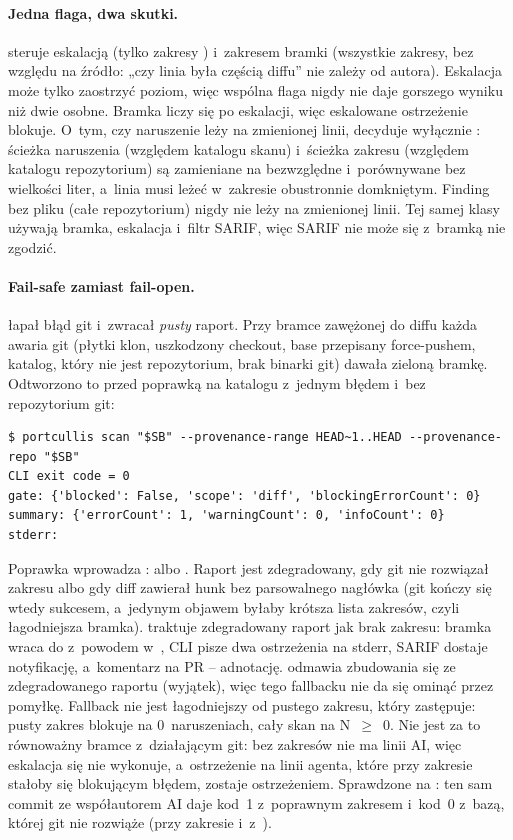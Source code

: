 \paragraph{Jedna flaga, dwa skutki.}  steruje eskalacją
(tylko zakresy ) i~zakresem bramki (wszystkie zakresy, bez względu na
źródło: „czy linia była częścią diffu” nie zależy od autora). Eskalacja może tylko
zaostrzyć poziom, więc wspólna flaga nigdy nie daje gorszego wyniku niż dwie osobne.
Bramka liczy się po eskalacji, więc eskalowane ostrzeżenie blokuje. O~tym, czy naruszenie
leży na zmienionej linii, decyduje wyłącznie : ścieżka naruszenia
(względem katalogu skanu) i~ścieżka zakresu (względem katalogu repozytorium) są
zamieniane na bezwzględne i~porównywane bez wielkości liter, a~linia musi leżeć w~zakresie
obustronnie domkniętym. Finding bez pliku (całe repozytorium) nigdy nie leży na zmienionej
linii. Tej samej klasy używają bramka, eskalacja i~filtr SARIF, więc SARIF nie może się
z~bramką nie zgodzić.

\paragraph{Fail-safe zamiast fail-open.}  łapał błąd git
i~zwracał \emph{pusty} raport. Przy bramce zawężonej do diffu każda awaria git (płytki
klon, uszkodzony checkout, base przepisany force-pushem, katalog, który nie jest
repozytorium, brak binarki git) dawała zieloną bramkę. Odtworzono to przed poprawką na
katalogu z~jednym błędem i~bez repozytorium git:

\begin{lstlisting}
$ portcullis scan "$SB" --provenance-range HEAD~1..HEAD --provenance-repo "$SB"
CLI exit code = 0
gate: {'blocked': False, 'scope': 'diff', 'blockingErrorCount': 0}
summary: {'errorCount': 1, 'warningCount': 0, 'infoCount': 0}
stderr:
\end{lstlisting}

Poprawka wprowadza :  albo
. Raport jest zdegradowany, gdy git nie rozwiązał zakresu albo gdy
diff zawierał hunk bez parsowalnego nagłówka \repopath{+++} (git kończy się wtedy
sukcesem, a~jedynym objawem byłaby krótsza lista zakresów, czyli łagodniejsza bramka).
 traktuje zdegradowany raport jak brak zakresu: bramka wraca do
  z~powodem w~, CLI pisze dwa
ostrzeżenia na stderr, SARIF dostaje notyfikację, a~komentarz na PR -- adnotację.
 odmawia zbudowania się ze zdegradowanego raportu (wyjątek), więc
tego fallbacku nie da się ominąć przez pomyłkę. Fallback nie jest łagodniejszy od pustego
zakresu, który zastępuje: pusty zakres blokuje na 0~naruszeniach, cały skan na N~$\geq$~0.
Nie jest za to równoważny bramce z~działającym git: bez zakresów nie ma linii AI, więc
eskalacja się nie wykonuje, a~ostrzeżenie na linii agenta, które przy zakresie 
stałoby się blokującym błędem, zostaje ostrzeżeniem. Sprawdzone na : ten
sam commit ze współautorem AI daje kod~1 z~poprawnym zakresem i~kod~0 z~bazą, której git
nie rozwiąże (przy zakresie  i~z~).


